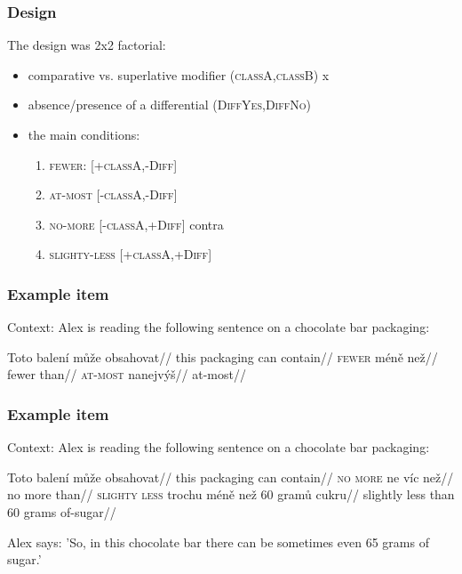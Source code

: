 \documentclass[10pt
]{beamer}
\newcommand{\cond}[1]{\textsc{#1}}
\begin{document}
\begin{frame}
  \frametitle{Design}

  The design was 2x2 factorial: 
  
  \begin{itemize}
    \item comparative vs. superlative modifier (\cond{classA},\cond{classB}) x 
    \item absence/presence of a differential (\cond{DiffYes},\cond{DiffNo})
    \item the main conditions:
    \begin{enumerate}
      \item \cond{fewer}: [+\cond{classA},-\cond{Diff}]
      \item \cond{at-most} [-\cond{classA},-\cond{Diff}]
      \item \cond{no-more} [-\cond{classA},+\cond{Diff}] \hfill contra \cite{nouwen2008upper}
      \item \cond{slighty-less} [+\cond{classA},+\cond{Diff}]
    \end{enumerate}
  \end{itemize}
  
\end{frame}

\begin{frame}
  \frametitle{Example item}

Context: Alex is reading the following sentence on a chocolate bar packaging:

  \pex[aboveexskip=0pt]   \begingl
  \gla Toto balení může obsahovat//
  \glb this packaging can contain//
  \endgl
  \a \hfill \cond{fewer}
  \begingl
  \gla méně než//
  \glb fewer than//
  \endgl
  \a \hfill \cond{at-most}
  \begingl
  \gla nanejvýš// 
  \glb at-most//
  \endgl
  \xe
  

\end{frame}

\begin{frame}
  \frametitle{Example item}

Context: Alex is reading the following sentence on a chocolate bar packaging:

  \pex[aboveexskip=0pt] 
  \begingl
  \gla Toto balení může obsahovat//
  \glb this packaging can contain//
  \endgl
  \a \hfill \cond{no more}
  \begingl
  \gla ne víc než//
  \glb no more than//
  \endgl
  \a \hfill \cond{slighty less}
  \begingl
  \gla trochu méně než  60 gramů cukru//
  \glb slightly less than 60 grams of-sugar//
  \endgl
  \xe

  Alex says: 'So, in this chocolate bar there can be sometimes even 65 grams of sugar.'

  

\end{frame}
\end{document}
